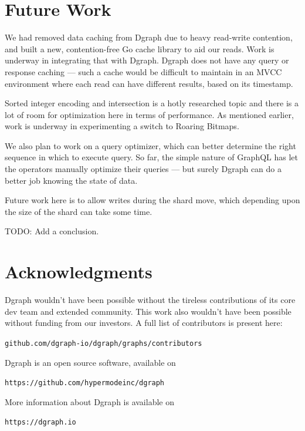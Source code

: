 \documentclass[letterpaper,twocolumn,10pt]{article}
\begin{document}
\section{Future Work}

We had removed data caching from Dgraph due to heavy read-write contention, and
built a new, contention-free Go cache library to aid our reads. Work is underway
in integrating that with Dgraph. Dgraph does not have any query or response
caching --- such a cache would be difficult to maintain in an MVCC environment
where each read can have different results, based on its timestamp.

Sorted integer encoding and intersection is a hotly researched topic and there
is a lot of room for optimization here in terms of performance. As mentioned
earlier, work is underway in experimenting a switch to Roaring Bitmaps.

We also plan to work on a query optimizer, which can better determine the right
sequence in which to execute query. So far, the simple nature of GraphQL has
let the operators manually optimize their queries --- but surely Dgraph can do a
better job knowing the state of data.

Future work here is to allow writes during the shard move, which depending upon
the size of the shard can take some time.

TODO: Add a conclusion.

\section{Acknowledgments}

Dgraph wouldn't have been possible without the tireless contributions of its
core dev team and extended community. This work also wouldn't have been possible
without funding from our investors. A full list of contributors is present here:
\begin{center}
  {\tt github.com/dgraph-io/dgraph/graphs/contributors}
\end{center}

Dgraph is an open source software, available on
\begin{center}
  {\tt https://github.com/hypermodeinc/dgraph}\\
\end{center}

More information about Dgraph is available on
\begin{center}
  {\tt https://dgraph.io}
\end{center}

{\footnotesize 
  }
\end{document}
